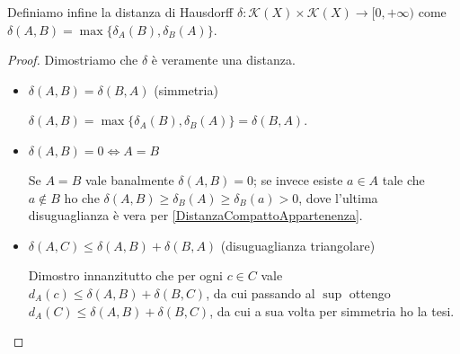 \begin{definition}
	Definiamo infine la distanza di Hausdorff $\delta:\mathcal{K}(X)\times \mathcal{K}(X) \to [0,+\infty)$ come $\delta(A,B)=\max\{ \delta_A(B),\delta_B(A) \}$.
\end{definition}

\begin{proof}
	Dimostriamo che $\delta$ è veramente una distanza.
	\begin{itemize}
		\item $\delta(A,B)=\delta(B,A)$ (simmetria)
		
		$\delta(A,B)=\max\{ \delta_A(B),\delta_B(A) \}=\delta(B,A)$.
		\item $\delta(A,B)=0 \iff A=B$
		
		Se $A=B$ vale banalmente $\delta(A,B)=0$; se invece esiste $a\in A$ tale che $a\not\in B$ ho che $\delta(A,B)\ge \delta_B(A)\ge \delta_B(a)>0$, dove l'ultima disuguaglianza è vera per \cref{DistanzaCompattoAppartenenza}.
		\item $\delta(A,C)\le \delta(A,B)+\delta(B,A)$ (disuguaglianza triangolare)
		
		Dimostro innanzitutto che per ogni $c\in C$ vale $d_A(c)\le \delta(A,B)+\delta(B,C)$, da cui passando al $\sup$ ottengo $d_A(C)\le \delta(A,B)+\delta(B,C)$, da cui a sua volta per simmetria ho la tesi.
		
	\end{itemize}

\end{proof}




